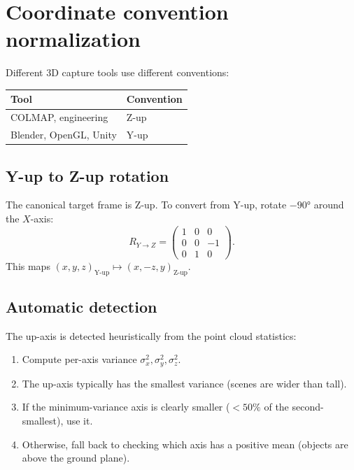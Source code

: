\documentclass[11pt]{article}
\begin{document}
\section{Coordinate convention normalization}
\label{sec:convention}

Different 3D capture tools use different conventions:
\begin{center}
\begin{tabular}{ll}
  \textbf{Tool} & \textbf{Convention} \\
  \hline
  COLMAP, engineering & Z-up \\
  Blender, OpenGL, Unity & Y-up \\
\end{tabular}
\end{center}

\subsection{Y-up to Z-up rotation}

The canonical target frame is Z-up. To convert from Y-up, rotate $-90°$
around the $X$-axis:
\begin{equation}
  R_{Y\to Z} =
  \begin{pmatrix}
    1 & 0 & 0 \\
    0 & 0 & -1 \\
    0 & 1 & 0
  \end{pmatrix}.
\end{equation}
This maps $(x, y, z)_{\text{Y-up}} \mapsto (x, -z, y)_{\text{Z-up}}$.

\subsection{Automatic detection}

The up-axis is detected heuristically from the point cloud statistics:
\begin{enumerate}
  \item Compute per-axis variance $\sigma^2_x, \sigma^2_y, \sigma^2_z$.
  \item The up-axis typically has the smallest variance (scenes are wider
        than tall).
  \item If the minimum-variance axis is clearly smaller ($< 50\%$ of the
        second-smallest), use it.
  \item Otherwise, fall back to checking which axis has a positive mean
        (objects are above the ground plane).
\end{enumerate}
\end{document}
